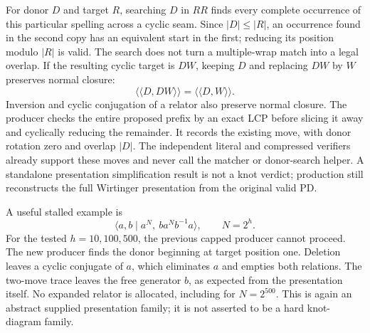 For donor $D$ and target $R$, searching $D$ in $RR$ finds every complete
occurrence of this particular spelling across a cyclic seam. Since
$|D|\le|R|$, an occurrence found in the second copy has an equivalent start
in the first; reducing its position modulo $|R|$ is valid. The search does
not turn a multiple-wrap match into a legal overlap. If the resulting cyclic
target is $DW$, keeping $D$ and replacing $DW$ by $W$ preserves normal closure:
\[
 \langle\!\langle D,DW\rangle\!\rangle
   =\langle\!\langle D,W\rangle\!\rangle.
\]
Inversion and cyclic conjugation of a relator also preserve normal closure.
The producer checks the entire proposed prefix by an exact LCP before
slicing it away and cyclically reducing the remainder. It records the
existing  move, with donor rotation zero and overlap $|D|$.
The independent literal and compressed verifiers already support these
moves and never call the matcher or donor-search helper. A standalone
presentation simplification result is not a knot verdict; production still
reconstructs the full Wirtinger presentation from the original valid PD.

A useful stalled example is
\[
 \langle a,b\mid a^N,\ ba^Nb^{-1}a\rangle,\qquad N=2^h.
\]
For the tested $h=10,100,500$, the previous capped producer cannot proceed.
The new producer finds the donor beginning at target position one. Deletion
leaves a cyclic conjugate of $a$, which eliminates $a$ and empties both
relations. The two-move trace leaves the free generator $b$, as expected
from the presentation itself. No expanded relator is allocated, including
for $N=2^{500}$. This is again an abstract supplied presentation family;
it is not asserted to be a hard knot-diagram family.


